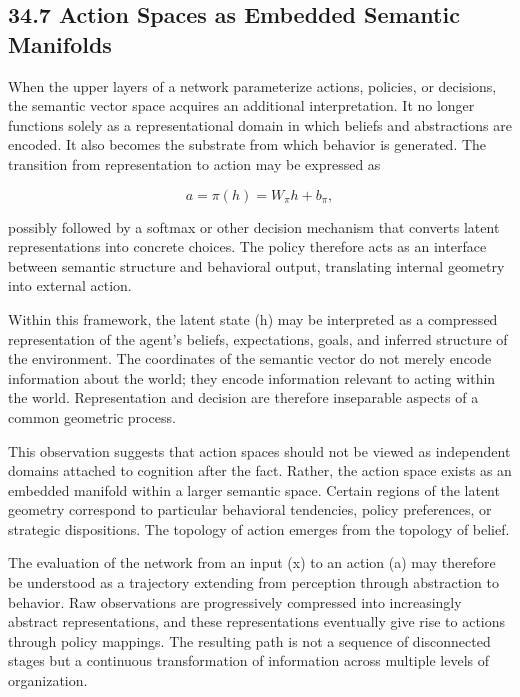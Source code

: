 \documentclass[12pt,letterpaper]{article}
\theoremstyle{remark}
\begin{document}
\subsection{34.7 Action Spaces as Embedded Semantic Manifolds}

When the upper layers of a network parameterize actions, policies, or decisions, the semantic vector space acquires an additional interpretation. It no longer functions solely as a representational domain in which beliefs and abstractions are encoded. It also becomes the substrate from which behavior is generated. The transition from representation to action may be expressed as

\[
a = \pi(h) = W_{\pi} h + b_{\pi},
\]

possibly followed by a softmax or other decision mechanism that converts latent representations into concrete choices. The policy therefore acts as an interface between semantic structure and behavioral output, translating internal geometry into external action.

Within this framework, the latent state (h) may be interpreted as a compressed representation of the agent's beliefs, expectations, goals, and inferred structure of the environment. The coordinates of the semantic vector do not merely encode information about the world; they encode information relevant to acting within the world. Representation and decision are therefore inseparable aspects of a common geometric process.

This observation suggests that action spaces should not be viewed as independent domains attached to cognition after the fact. Rather, the action space exists as an embedded manifold within a larger semantic space. Certain regions of the latent geometry correspond to particular behavioral tendencies, policy preferences, or strategic dispositions. The topology of action emerges from the topology of belief.

The evaluation of the network from an input (x) to an action (a) may therefore be understood as a trajectory extending from perception through abstraction to behavior. Raw observations are progressively compressed into increasingly abstract representations, and these representations eventually give rise to actions through policy mappings. The resulting path is not a sequence of disconnected stages but a continuous transformation of information across multiple levels of organization.
\end{document}
